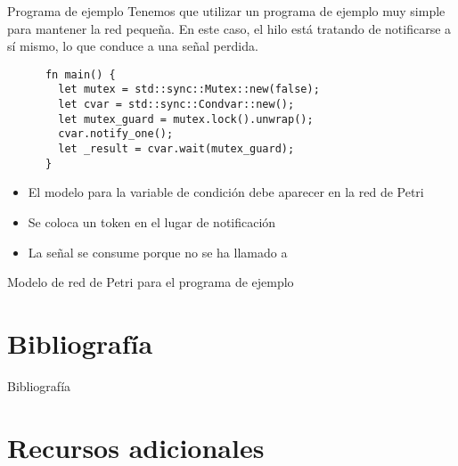 \documentclass{beamer}
\begin{document}
\begin{frame}[fragile]{Programa de ejemplo}
  Tenemos que utilizar un programa de ejemplo muy simple para mantener la red pequeña.
  En este caso, el hilo está tratando de notificarse a sí mismo, lo que conduce a una señal perdida.

  \begin{listing}
    \begin{verbatim}
      fn main() {
        let mutex = std::sync::Mutex::new(false);
        let cvar = std::sync::Condvar::new();
        let mutex_guard = mutex.lock().unwrap();
        cvar.notify_one();
        let _result = cvar.wait(mutex_guard);
      }     
    \end{verbatim}
  \end{listing}

  \begin{itemize}
    \item El modelo para la variable de condición debe aparecer en la red de Petri
    \item Se coloca un token en el lugar de notificación
    \item La señal se consume porque no se ha llamado a 
  \end{itemize}
\end{frame}

\begin{frame}{Modelo de red de Petri para el programa de ejemplo}
  \begin{figure}
    \centering
    
  \end{figure}
\end{frame}

\section{Bibliografía}

\begin{frame}[allowframebreaks]{Bibliografía}
  \tiny
  
  
\end{frame}

\section{Recursos adicionales}
\end{document}
